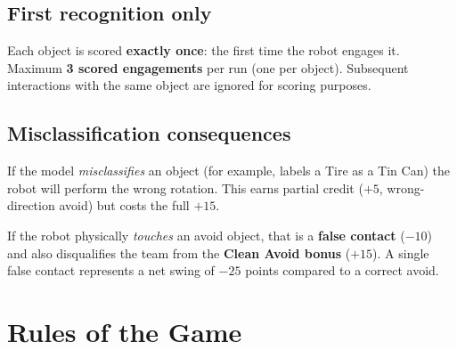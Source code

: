 \documentclass[a4]{article}
\begin{document}
\subsection*{First recognition only}

Each object is scored \textbf{exactly once}: the first time the robot engages it. Maximum \textbf{3 scored engagements} per run (one per object). Subsequent interactions with the same object are ignored for scoring purposes.

\subsection*{Misclassification consequences}

If the model \textit{misclassifies} an object (for example, labels a Tire as a Tin Can) the robot will perform the wrong rotation. This earns partial credit ($+5$, wrong-direction avoid) but costs the full $+15$.

If the robot physically \textit{touches} an avoid object, that is a \textbf{false contact} ($-10$) and also disqualifies the team from the \textbf{Clean Avoid bonus} ($+15$). A single false contact represents a net swing of $-25$ points compared to a correct avoid.

\pagebreak
\section{Rules of the Game}
\end{document}
